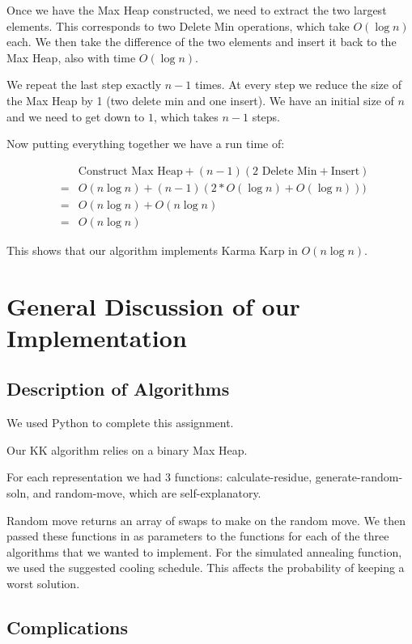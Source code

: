 \documentclass[11pt]{article}
\begin{document}
Once we have the Max Heap constructed, we need to extract the two largest elements. This corresponds to two Delete Min operations, which take $O(\log n)$ each. We then take the difference of the two elements and insert it back to the Max Heap, also with time $O(\log n)$.

We repeat the last step exactly $n-1$ times. At every step we reduce the size of the Max Heap by 1 (two delete min and one insert). We have an initial size of $n$ and we need to get down to $1$, which takes $n-1$ steps.

Now putting everything together we have a run time of:

\begin{eqnarray}
&&\text{Construct Max Heap} + (n-1)(\text{2 Delete Min}+\text{Insert})\\
&=& O(n \log n)+(n-1)(2*O(\log n)+O(\log n)))\\
&=& O(n\log n) + O(n\log n)\\
&=& \boxed{O(n\log n)}
\end{eqnarray}

This shows that our algorithm implements Karma Karp in $O(n\log n)$.

\section{General Discussion of our Implementation}
\subsection{Description of Algorithms}

We used Python to complete this assignment.

Our KK algorithm relies on a binary Max Heap.


For each representation we had 3 functions: calculate-residue, generate-random-soln, and random-move, which are self-explanatory. 

Random move returns an array of swaps to make on the random move. We then passed these functions in as parameters to the functions for each of the three algorithms that we wanted to implement. For the simulated annealing function, we used the suggested cooling schedule. This affects the probability of keeping a worst solution.



\subsection{Complications}
\end{document}
